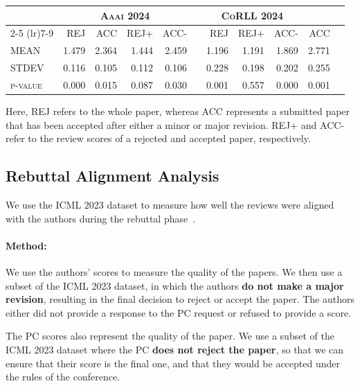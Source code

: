 \begin{minipage}[t]{\linewidth}
\begin{table}[t]
\begin{tabular}{l|rrrr|rrr|rrr}
\toprule
\multirow{2}{*}{\textbf{}}        & \multicolumn{4}{c|}{\textbf{\textsc{Aaai 2024}}}            &  & \multicolumn{3}{c}{\textbf{\textsc{CoRLL 2024}}} \\
\cmidrule(lr){2-5} \cmidrule(lr){7-9}
                         & REJ   & ACC    & REJ+    & ACC-    &  & REJ   & REJ+    & ACC-    & ACC \\
\textsc{MEAN}              & 1.479 & 2.364 & 1.444 & 2.459 &  & 1.196 & 1.191 & 1.869 & 2.771 \\ \hline
\textsc{STDEV}            & 0.116 & 0.105 & 0.112 & 0.106 &  & 0.228 & 0.198 & 0.202 & 0.255 \\
\textsc{p-value}         & 0.000 & 0.015 & 0.087 & 0.030 &  & 0.001 & 0.557 & 0.000 & 0.001 \\
\bottomrule
\end{tabular}
\label{tab:correlations}
\end{table}
Here, REJ refers to the whole paper, whereas ACC represents a submitted paper that has been accepted after either a minor or major revision. REJ+ and ACC- refer to the review scores of a rejected and accepted paper, respectively. 
\subsection{Rebuttal Alignment Analysis}
We use the \textsc{ICML 2023} dataset to measure how well the reviews were aligned with the authors during the rebuttal phase~\citep{DBLP:journals/corr/abs-1903-11367}. 

\paragraph{Method:}
We use the authors' scores to measure the quality of the papers. We then use a subset of the \textsc{ICML 2023} dataset, in which the authors \textbf{do not make a major revision}, resulting in the final decision to reject or accept the paper. The authors either did not provide a response to the PC request or refused to provide a score. 

The PC scores also represent the quality of the paper. We use a subset of the \textsc{ICML 2023} dataset where the PC \textbf{does not reject the paper}, so that we can ensure that their score is the final one, and that they would be accepted under the rules of the conference.

\end{minipage}
